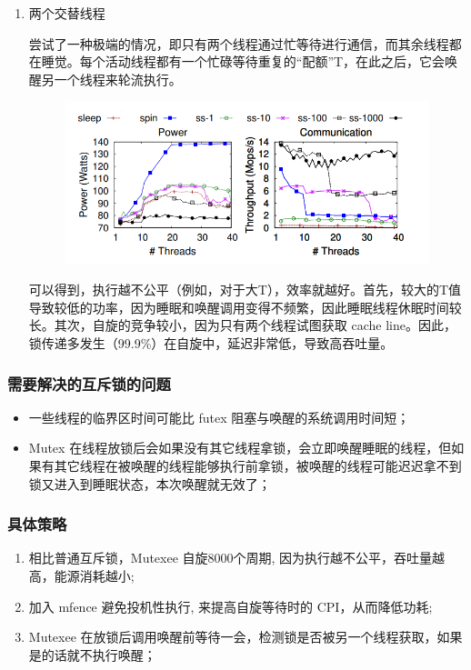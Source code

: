 \documentclass[UTF8]{ctexart}
\begin{document}
\begin{enumerate}
    \item 两个交替线程

    尝试了一种极端的情况，即只有两个线程通过忙等待进行通信，而其余线程都在睡觉。每个活动线程都有一个忙碌等待重复的“配额”T，在此之后，它会唤醒另一个线程来轮流执行。

    \begin{figure}[ht]
        \centering
        \includegraphics[scale=0.5]{images/img4.png}
    \end{figure}

    可以得到，执行越不公平（例如，对于大T），效率就越好。首先，较大的T值导致较低的功率，因为睡眠和唤醒调用变得不频繁，因此睡眠线程休眠时间较长。其次，自旋的竞争较小，因为只有两个线程试图获取 cache line。因此，锁传递多发生（99.9\%）在自旋中，延迟非常低，导致高吞吐量。

\end{enumerate}

\subsubsection{需要解决的互斥锁的问题}

\begin{itemize}
    \item 一些线程的临界区时间可能比 futex 阻塞与唤醒的系统调用时间短；
    \item Mutex 在线程放锁后会如果没有其它线程拿锁，会立即唤醒睡眠的线程，但如果有其它线程在被唤醒的线程能够执行前拿锁，被唤醒的线程可能迟迟拿不到锁又进入到睡眠状态，本次唤醒就无效了；
\end{itemize}

\subsubsection{具体策略}

\begin{enumerate}
    \item 相比普通互斥锁，Mutexee 自旋8000个周期, 因为执行越不公平，吞吐量越高，能源消耗越小;
    \item 加入 mfence 避免投机性执行, 来提高自旋等待时的 CPI，从而降低功耗;
    \item Mutexee 在放锁后调用唤醒前等待一会，检测锁是否被另一个线程获取，如果是的话就不执行唤醒；
\end{enumerate}
\end{document}
